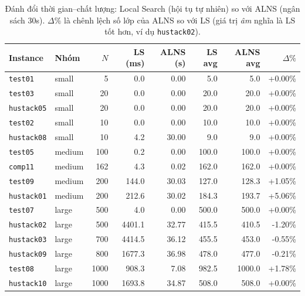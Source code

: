 \begin{table}[H]
\centering\small
\caption{Đánh đổi thời gian--chất lượng: Local Search (hội tụ tự nhiên) so với
ALNS (ngân sách $30$s). $\Delta\%$ là chênh lệch số lớp của ALNS so với LS
(giá trị \emph{âm} nghĩa là LS tốt hơn, ví dụ \texttt{hustack02}).}
\label{tab:tradeoff}
\begin{tabular}{ll r rr rr r}
\toprule
Instance & Nhóm & $N$ & LS (ms) & ALNS (s) & LS avg & ALNS avg & $\Delta\%$ \\
\midrule
\texttt{test01} & small & 5 & 0.0 & 0.00 & 5.0 & 5.0 & +0.00\% \\
\texttt{test03} & small & 20 & 0.0 & 0.00 & 20.0 & 20.0 & +0.00\% \\
\texttt{hustack05} & small & 20 & 0.0 & 0.00 & 20.0 & 20.0 & +0.00\% \\
\texttt{test02} & small & 10 & 0.0 & 0.00 & 10.0 & 10.0 & +0.00\% \\
\texttt{hustack08} & small & 10 & 4.2 & 30.00 & 9.0 & 9.0 & +0.00\% \\
\texttt{test05} & medium & 100 & 0.2 & 0.00 & 100.0 & 100.0 & +0.00\% \\
\texttt{comp11} & medium & 162 & 4.3 & 0.02 & 162.0 & 162.0 & +0.00\% \\
\texttt{test09} & medium & 200 & 144.0 & 30.03 & 127.0 & 128.3 & +1.05\% \\
\texttt{hustack01} & medium & 200 & 212.6 & 30.02 & 184.3 & 193.7 & +5.06\% \\
\texttt{test07} & large & 500 & 4.0 & 0.00 & 500.0 & 500.0 & +0.00\% \\
\texttt{hustack02} & large & 500 & 4401.1 & 32.77 & 415.5 & 410.5 & -1.20\% \\
\texttt{hustack03} & large & 700 & 4414.5 & 36.12 & 455.5 & 453.0 & -0.55\% \\
\texttt{hustack09} & large & 800 & 1677.3 & 36.98 & 478.0 & 477.0 & -0.21\% \\
\texttt{test08} & large & 1000 & 908.3 & 7.08 & 982.5 & 1000.0 & +1.78\% \\
\texttt{hustack10} & large & 1000 & 1693.8 & 34.87 & 508.0 & 508.0 & +0.00\% \\
\bottomrule
\end{tabular}
\end{table}

